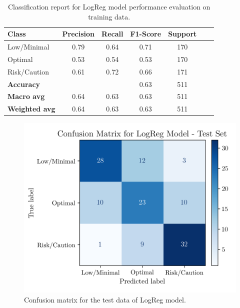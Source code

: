 \documentclass[conference]{IEEEtran}
\begin{document}
\begin{table}[H]
\centering
\caption{Classification report for LogReg model performance evaluation on training data.}
\label{crTrainLogReg}
\begin{tabular}{lcccccc}
\toprule
\textbf{Class} & \textbf{Precision} & \textbf{Recall} & \textbf{F1-Score} & \textbf{Support} \\
\midrule
Low/Minimal & 0.79 & 0.64 & 0.71 & 170 \\
Optimal & 0.53 & 0.54 & 0.53 & 170 \\
Risk/Caution & 0.61 & 0.72 & 0.66 & 171 \\
\midrule
\textbf{Accuracy} &  &  & 0.63 & 511 \\
\textbf{Macro avg} & 0.64 & 0.63 & 0.63 & 511 \\
\textbf{Weighted avg} & 0.64 & 0.63 & 0.63 & 511 \\
\bottomrule
\end{tabular}
\end{table} %

\begin{figure}[H]
    \centering
    \includegraphics[width=1\linewidth]{assets/LOGR_confmatTest.png}
    \caption{Confusion matrix for the test data of LogReg model.}
    \label{cm_Test_LogReg}
\end{figure} %
\end{document}
